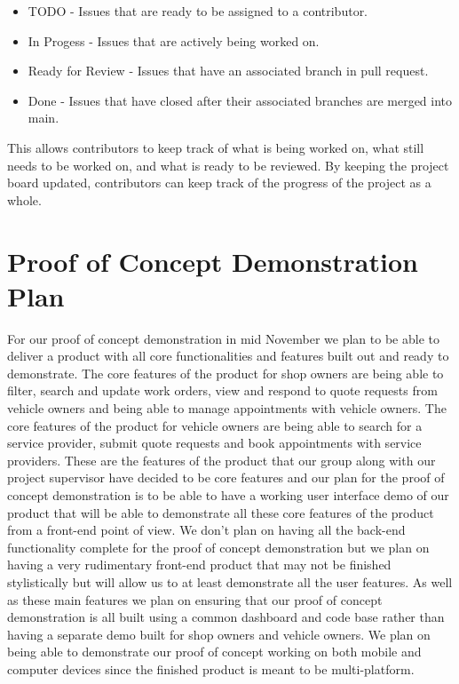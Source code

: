\documentclass{article}
\begin{document}
\begin{itemize}
    \item TODO - Issues that are ready to be assigned to a contributor.
    \item In Progess - Issues that are actively being worked on.
    \item Ready for Review - Issues that have an associated branch in pull request.
    \item Done - Issues that have closed after their associated branches are merged into main.
\end{itemize}

This allows contributors to keep track of what is being worked on, what still needs to be worked on, and what is ready to be reviewed. By keeping the project board updated, contributors can keep track of the progress of the project as a whole.

\section{Proof of Concept Demonstration Plan}

For our proof of concept demonstration in mid November we plan to be able to deliver a product with all core functionalities and features built out and ready to demonstrate. The core features of the product for shop owners are being able to filter, search and update work orders, view and respond to quote requests from vehicle owners and being able to manage appointments with vehicle owners. The core features of the product for vehicle owners are being able to search for a service provider, submit quote requests and book appointments with service providers. These are the features of the product that our group along with our project supervisor have decided to be core features and our plan for the proof of concept demonstration is to be able to have a working user interface demo of our product that will be able to demonstrate all these core features of the product from a front-end point of view. We don't plan on having all the back-end functionality complete for the proof of concept demonstration but we plan on having a very rudimentary front-end product that may not be finished stylistically but will allow us to at least demonstrate all the user features. As well as these main features we plan on ensuring that our proof of concept demonstration is all built using a common dashboard and code base rather than having a separate demo built for shop owners and vehicle owners. We plan on being able to demonstrate our proof of concept working on both mobile and computer devices since the finished product is meant to be multi-platform.
\end{document}
